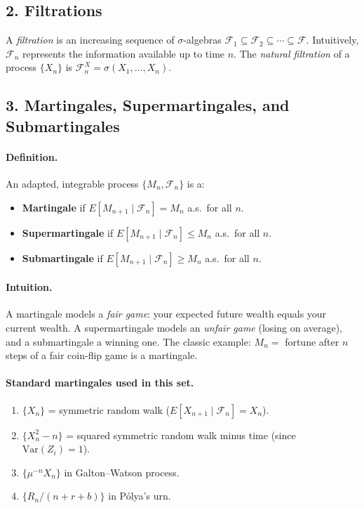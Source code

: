 \documentclass[11pt]{article}
\newcommand{\F}{\mathcal{F}}
\newcommand{\1}{\mathbf{1}}
\theoremstyle{plain}
\begin{document}
\subsection*{2. Filtrations}

A \emph{filtration} is an increasing sequence of $\sigma$-algebras
$\F_1\subseteq\F_2\subseteq\cdots\subseteq\F$. Intuitively, $\F_n$ represents
the information available up to time $n$. The \emph{natural filtration} of a
process $\{X_n\}$ is $\F_n^X=\sigma(X_1,\ldots,X_n)$.

\subsection*{3. Martingales, Supermartingales, and Submartingales}

\paragraph{Definition.}
An adapted, integrable process $\{M_n,\F_n\}$ is a:
\begin{itemize}
  \item \textbf{Martingale} if $E[M_{n+1}\mid\F_n]=M_n$ a.s.\ for all $n$.
  \item \textbf{Supermartingale} if $E[M_{n+1}\mid\F_n]\le M_n$ a.s.\ for all $n$.
  \item \textbf{Submartingale} if $E[M_{n+1}\mid\F_n]\ge M_n$ a.s.\ for all $n$.
\end{itemize}

\paragraph{Intuition.}
A martingale models a \emph{fair game}: your expected future wealth equals your
current wealth. A supermartingale models an \emph{unfair game} (losing on average),
and a submartingale a winning one. The classic example: $M_n=$ fortune after $n$
steps of a fair coin-flip game is a martingale.

\paragraph{Standard martingales used in this set.}
\begin{enumerate}
  \item $\{X_n\}$ = symmetric random walk ($E[X_{n+1}\mid\F_n]=X_n$).
  \item $\{X_n^2-n\}$ = squared symmetric random walk minus time (since
        $\mathrm{Var}(Z_i)=1$).
  \item $\{\mu^{-n}X_n\}$ in Galton--Watson process.
  \item $\{R_n/(n+r+b)\}$ in P\'olya's urn.
\end{enumerate}
\end{document}
